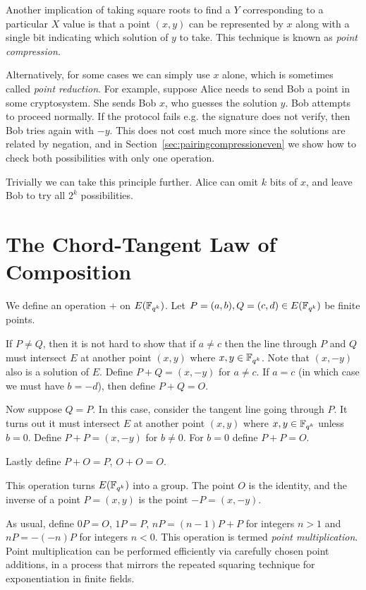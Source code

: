 Another implication of taking square roots to find a $Y$ corresponding to
a particular $X$ value is that
a point $(x,y)$ can be represented by $x$ along with a single bit indicating
which solution of $y$ to take. This technique is known as \emph{point
compression}.

Alternatively, for some cases we can simply use $x$ alone, which
is sometimes called \emph{point reduction}. For example,
suppose Alice needs to send Bob a point in some cryptosystem. She sends
Bob $x$, who guesses the solution $y$. Bob attempts to proceed normally.
If the protocol fails e.g. the signature does not verify, then Bob tries again
with $-y$. This does not cost much more since the solutions are
related by negation, and in Section~\ref{sec:pairingcompressioneven}
we show how to check both possibilities with only one operation.

Trivially we can take this principle further. Alice can
omit $k$ bits of $x$, and leave Bob to try all $2^k$ possibilities.

\section {The Chord-Tangent Law of Composition}

We define an operation $+$ on $E(\mathbb{F}_{q^k})$.
Let $P = (a,b), Q = (c,d) \in E(\mathbb{F}_{q^k})$ be finite points.

If $P \ne Q$, then it is not hard to show that if $a \ne c$
then the line through $P$ and $Q$ must intersect $E$ at another point
$(x,y)$ where $x, y\in \mathbb{F}_{q^k}$. Note that $(x,-y)$ also is a solution of $E$.
Define $P + Q = (x, -y)$ for $a \ne c$.
If $a = c$ (in which case we must have $b = -d$),
then define $P + Q = O$.

Now suppose $Q = P$. In this case, consider the tangent line going through
$P$. It turns out it must intersect $E$ at another point $(x,y)$ where
$x,y\in\mathbb{F}_{q^k}$ unless $b = 0$. Define $P + P = (x, -y)$ for $b \ne 0$.
For $b = 0$ define $P + P = O$.

Lastly define $P + O = P$, $O + O = O$.

This operation turns $E(\mathbb{F}_{q^k})$ into a group.
The point $O$ is the identity, and the inverse
of a point $P = (x,y)$ is the point $-P = (x,-y)$.

As usual, define $0 P = O$, $1 P = P$,
$n P = (n-1)P + P$ for integers $n > 1$ and $n P = -(-n)P$ for integers
$n < 0$.
This operation is termed \emph{point multiplication}.
Point multiplication can be performed efficiently via carefully
chosen point additions, in a process that mirrors the repeated
squaring technique for exponentiation in finite fields.

